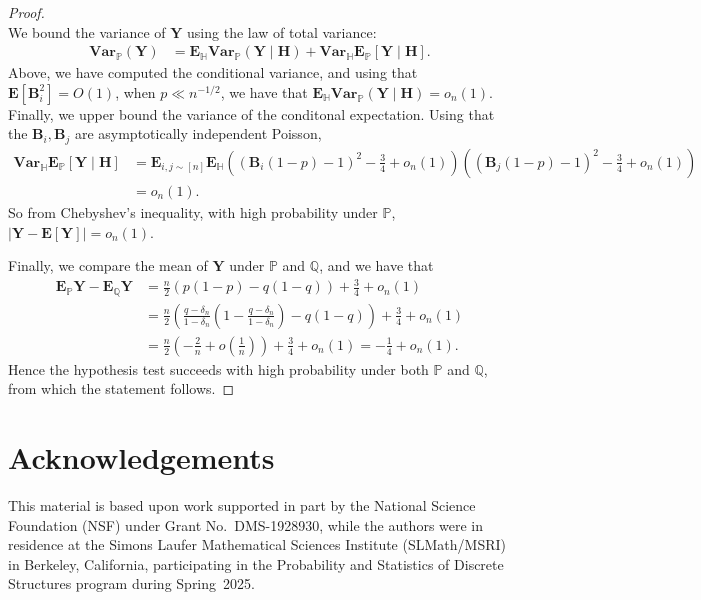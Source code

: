 \documentclass[11pt]{article}
\newcommand{\e}{{\mathbf E}}
\newcommand{\va}{{\mathbf{Var}}}
\newcommand{\bB}{\mathbf{B}}
\newcommand{\bH}{\mathbf{H}}
\newcommand{\bY}{\mathbf{Y}}
\newcommand{\bbH}{\mathbb{H}}
\newcommand{\bbP}{\mathbb{P}}
\newcommand{\bbQ}{\mathbb{Q}}
\numberwithin{equation}{section}
\numberwithin{thm}{section}
\begin{document}
\begin{proof}
\[\]
We bound the variance of $\bY$ using the law of total variance:
\begin{align*}
\va_{\bbP}(\bY) &=
\e_{\bbH} \va_{\bbP}(\bY\mid\bH) + \va_{\bbH} \e_{\bbP}[\bY \mid \bH].
\end{align*}
Above, we have computed the conditional variance, and using that $\e[\bB_i^2] = O(1)$, when $p \ll n^{-1/2}$, 
we have that $\e_\bbH \va_{\bbP}(\bY \mid \bH) = o_n(1)$.
Finally, we upper bound the variance of the conditonal expectation. 
Using that the $\bB_i,\bB_j$ are asymptotically independent Poisson,
\begin{align*}
\va_{\bbH} \e_{\bbP}[\bY \mid \bH]
&= \e_{i,j\sim [n]} \e_{\bbH} ((\bB_i(1-p)-1)^2 - \frac{3}{4} + o_n(1)) ((\bB_j(1-p)-1)^2 - \frac{3}{4} + o_n(1))\\
&= o_n(1).
\end{align*}
So from Chebyshev's inequality, with high probability under $\bbP$, $|\bY - \e[\bY]| = o_n(1)$.


Finally, we compare the mean of $\bY$ under $\bbP$ and $\bbQ$, and we have that
\begin{align*}
\e_\bbP \bY - \e_{\bbQ}\bY
&= \frac{n}{2}(p(1-p) - q(1-q)) + \frac{3}{4} + o_n(1)\\
&= \frac{n}{2} \left(\frac{q-\delta_n}{1-\delta_n}\left(1-\frac{q-\delta_n}{1-\delta_n}\right) - q(1-q)\right) + \frac{3}{4} + o_n(1)\\
&= \frac{n}{2}\left(- \frac{2}{n} + o(\frac{1}{n})\right) + \frac{3}{4} + o_n(1)
= - \frac{1}{4} +o_n(1).
\end{align*}
Hence the hypothesis test succeeds with high probability under both $\bbP$ and $\bbQ$, from which the statement follows.
\end{proof}





\section{\bf Acknowledgements}

This material is based upon work supported in part by the National Science Foundation (NSF) under Grant No.~DMS-1928930, while the authors were in residence at the Simons Laufer Mathematical Sciences Institute (SLMath/MSRI) in Berkeley, California, participating in the Probability and Statistics of Discrete Structures program during Spring~2025.

\small 





                 
\appendix
\end{document}
